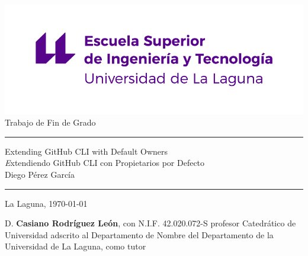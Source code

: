 \documentclass[spanish,a4paper,12pt,oneside]{extreport}
\begin{document}
\renewcommand\listtablename{Índice de Tablas}    
\renewcommand\listfigurename{Índice de Figuras}    

\pagestyle{empty}
\thispagestyle{empty}


\newcommand{\HRule}{\rule{\linewidth}{1mm}}
\setlength{\parindent}{0mm}
\setlength{\parskip}{0mm}


\begin{center}
\includegraphics[scale=0.8]{images/escuela-ingenieria-tecnologia-original}\\[10mm]
{\Huge Trabajo de Fin de Grado}
\end{center}

\HRule
\begin{flushright}
    {\Huge Extending GitHub CLI with Default Owners} \\[2.5mm]
    {\Large \textit Extendiendo GitHub CLI con Propietarios por Defecto} \\[5mm]
    {\Large Diego Pérez García} \\[5mm]
\end{flushright}
\HRule

\begin{center}
  \Large La Laguna, \today
\end{center}

\setlength{\parindent}{5mm}

\newpage
\thispagestyle{empty}

D. {\bf Casiano Rodríguez León}, con N.I.F. 42.020.072-S  profesor Catedrático de Universidad adscrito al Departamento de Nombre del Departamento de la Universidad de La Laguna, como tutor
\end{document}
